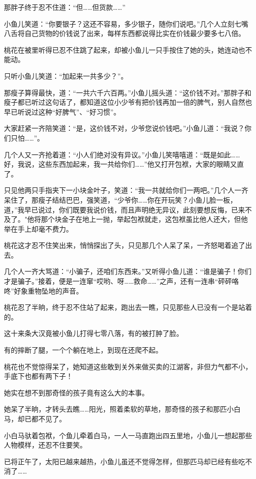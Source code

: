 \documentclass[12pt,oneside]{book}
\begin{document}
那胖子终于忍不住道：``但\ldots\ldots 但货款\ldots\ldots{}''

小鱼儿笑道：``你要银子？这还不容易，多少银子，随你们说吧。''几个人立刻七嘴八舌将自己货物的价钱说了出来，每样东西都说得比实在价钱最少要多七八倍。

桃花在被里听得已忍不住跳了起来，却被小鱼儿一只手按住了她的头，她连动也不能动。

只听小鱼儿笑道：``加起来一共多少？''。

那瘦子算得最快，道：``一共六千六百两。''小鱼儿摇头道：``这价钱不对。''那胖子和瘦子都已听过这句话了，都知道这位小少爷有把价钱再加一倍的脾气，别人自然也早已听说过这种``好脾气''、``好习惯''。

大家赶紧一齐陪笑道：``是，这价钱不对，少爷您说价钱吧。''小鱼儿道：``我说？你们只怕\ldots\ldots{}''。

几个人又一齐抢着道：``小人们绝对没有异议。''小鱼儿笑嘻嘻道：``既是如此\ldots\ldots 好，我说，这些东西加起来，我一共给你们\ldots\ldots{}''他又打开包袱，大家的眼睛又直了。

只见他两只手指夹下一小块金叶子，笑道：``我一共就给你们一两吧。''几个人一齐呆住了，那瘦子结结巴巴，强笑道，``少爷你\ldots\ldots 你在开玩笑？小鱼儿脸一板，道，''我早已说过，你们既要我说价钱，而且声明绝无异议，此刻要想反悔，已来不及了。"他将那个块金子在地上一抛，举起包袱就走，这包袱虽比他人还大，但他举在手上却毫不费力。

桃花这才忍不住笑出来，悄悄探出了头，只见那几个人呆了呆，一齐怒喝着追了出去。

几个人一齐大骂道：``小骗子，还咱们东西来。''又听得小鱼儿道：``谁是骗子！你们才是骗子。''接着，便是一连窜``哎哟、呀\ldots\ldots 救命\ldots\ldots{}''之声，还有一连串``砰砰咯咚''好象重物坠地的声音。

桃花忍了半晌，终于忍不住站了起来，跑出去一瞧，只见那些人已没有一个是站着的。

这十来条大汉竟被小鱼儿打得七零八落，有的被打肿了脸。

有的摔断了腿，一个个躺在地上，到现在还爬不起。

桃花也不觉惊得呆了，她知道这些敢到关外来做买卖的江湖客，非但力气都不小，手底下也都有两下子！

她实在想不到那奇怪的孩子竟有这么大的本事。

她呆了半晌，才转头去瞧\ldots\ldots 阳光，照着柔软的草地，那奇怪的孩子和那匹小白马，却已都不见了。

小白马驮着包袱，个鱼儿牵着白马，一人一马直跑出四五里地，小鱼儿一想起那些人物模样，还忍不住要笑。

已将正午了，太阳已越来越热，小鱼儿虽还不觉得怎样，但那匹马却已经有些吃不消了\ldots\ldots{}
\end{document}
